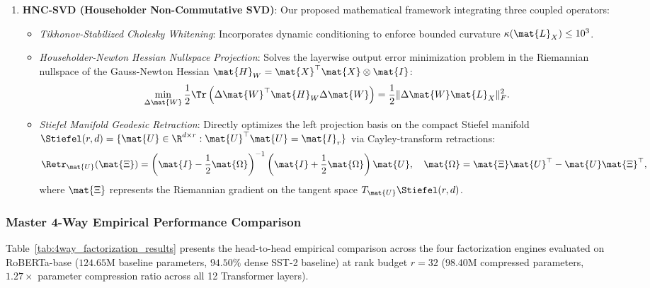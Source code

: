 \begin{enumerate}
    \item \textbf{\neuralops{} HNC-SVD (Householder Non-Commutative SVD)}: Our proposed mathematical framework integrating three coupled operators:
    \begin{itemize}
        \item \emph{Tikhonov-Stabilized Cholesky Whitening}: Incorporates dynamic conditioning to enforce bounded curvature $\kappa(\mat{L}_X) \le 10^3$.
        \item \emph{Householder-Newton Hessian Nullspace Projection}: Solves the layerwise output error minimization problem in the Riemannian nullspace of the Gauss-Newton Hessian $\mat{H}_W = \mat{X}^\top \mat{X} \otimes \mat{I}$:
        \begin{equation}
        \min_{\Delta \mat{W}} \frac{1}{2} \Tr\left(\Delta \mat{W}^\top \mat{H}_W \Delta \mat{W}\right) = \frac{1}{2} \|\Delta \mat{W} \mat{L}_X\|_F^2.
        \end{equation}
        \item \emph{Stiefel Manifold Geodesic Retraction}: Directly optimizes the left projection basis on the compact Stiefel manifold $\Stiefel(r, d) = \{\mat{U} \in \R^{d \times r} : \mat{U}^\top \mat{U} = \mat{I}_r\}$ via Cayley-transform retractions:
        \begin{equation}
        \Retr_{\mat{U}}(\mat{\Xi}) = \left(\mat{I} - \frac{1}{2} \mat{\Omega}\right)^{-1} \left(\mat{I} + \frac{1}{2} \mat{\Omega}\right) \mat{U}, \quad \mat{\Omega} = \mat{\Xi} \mat{U}^\top - \mat{U} \mat{\Xi}^\top,
        \label{eq:cayley_retraction}
        \end{equation}
        where $\mat{\Xi}$ represents the Riemannian gradient on the tangent space $T_{\mat{U}}\Stiefel(r, d)$.
    \end{itemize}
\end{enumerate}

\subsubsection{Master 4-Way Empirical Performance Comparison}
\label{sec:ablations_4way_results}

Table~\ref{tab:4way_factorization_results} presents the head-to-head empirical comparison across the four factorization engines evaluated on RoBERTa-base ($124.65\text{M}$ baseline parameters, $94.50\%$ dense SST-2 baseline) at rank budget $r=32$ ($98.40\text{M}$ compressed parameters, $1.27\times$ parameter compression ratio across all 12 Transformer layers).

